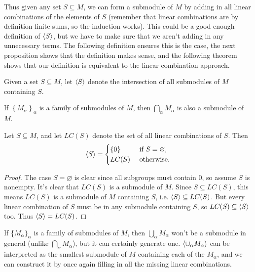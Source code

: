 \documentclass[twoside,10pt]{report}
\begin{document}
Thus given any set $S \subseteq M$, we can form a submodule of $M$ by adding in all linear combinations of the elements of $S$ (remember that linear combinations are by definition finite sums, so the induction works). This could be a good enough definition of $\langle S \rangle$, but we have to make sure that we aren't adding in any unnecessary terms. The following definition ensures this is the case, the next proposition shows that the definition makes sense, and the following theorem shows that our definition is equivalent to the linear combination approach.

\begin{defn}[]
Given a set $S \subseteq M$, let $\langle S \rangle$ denote the intersection of all submodules of $M$ containing $S$.
\end{defn}

\begin{prop}
If $\left\{ M_{\alpha} \right\}_{\alpha}$ is a family of submodules of $M$, then $\bigcap_{\alpha}M_{\alpha}$ is also a submodule of $M$.
\end{prop}

\begin{thrm}[]
	\label{thrm:LC}
	Let $S \subseteq M$, and let $LC(S)$ denote the set of all linear combinations of $S$. Then
	\[
	\langle S \rangle=
	\begin{cases}
		\left\{ 0 \right\} & \text{ if } S = \varnothing,\\
		LC(S) & \text{ otherwise}.
	\end{cases}
	\] 
\end{thrm}
\begin{proof}
	The case $S = \varnothing$ is clear since all subgroups must contain 0, so assume $S$ is nonempty. It's clear that $LC(S)$ is a submodule of $M$. Since $S \subseteq LC(S)$, this means $LC(S)$ is a submodule of $M$ containing $S$, i.e. $\langle S \rangle \subseteq LC(S)$. But every linear combination of $S$ must be in any submodule containing $S$, so $LC(S) \subseteq \langle S \rangle$ too. Thus $\langle S \rangle= LC(S)$.
\end{proof}

If \{$M_{\alpha}\}_{\alpha}$ is a family of submodules of $M$, then $\bigcup_{\alpha}M_{\alpha}$ won't be a submodule in general (unlike $\bigcap_{\alpha}M_\alpha$), but it can certainly generate one. $\langle \cup_{\alpha}M_{\alpha} \rangle$ can be interpreted as the smallest submodule of $M$ containing each of the $M_{\alpha}$, and we can construct it by once again filling in all the missing linear combinations.
\end{document}
